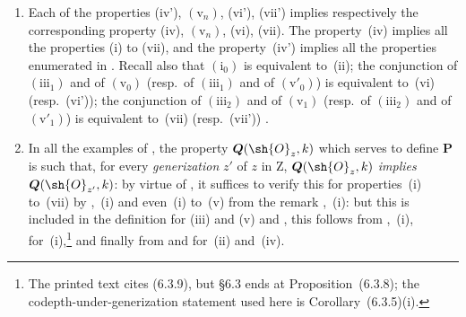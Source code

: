 \begin{remarks}[7.3.9]
\label{IV.7.3.9}
\begin{enumerate}[label=\emph{\roman*)}]
  \item Each of the properties (iv'), $(\mathrm{v}_n)$, (vi'), (vii') implies respectively the corresponding property (iv), $(\mathrm{v}_n)$, (vi), (vii).
  The property~(iv) implies all the properties (i) to (vii), and the property~(iv') implies all the properties enumerated in .
  Recall also that $(\mathrm{i}_0)$ is equivalent to~(ii); the conjunction of $(\mathrm{iii}_1)$ and of $(\mathrm{v}_0)$ (resp.~of $(\mathrm{iii}_1)$ and of $(\mathrm{v}'_0)$) is equivalent to~(vi) (resp.~(vi')); the conjunction of $(\mathrm{iii}_2)$ and of $(\mathrm{v}_1)$ (resp.~of $(\mathrm{iii}_2)$ and of $(\mathrm{v}'_1)$) is equivalent to~(vii) (resp.~(vii')) .

  \item In all the examples of , the property $\boldsymbol{Q}(\sh{O}_z,k)$ which serves to define $\boldsymbol{P}$ is such that, for every \emph{generization} $z'$ of $z$ in $\mathrm{Z}$, $\boldsymbol{Q}(\sh{O}_z,k)$ \emph{implies} $\boldsymbol{Q}(\sh{O}_{z'},k)$: by virtue of , it suffices to verify this for properties~(i) to~(vii) by ,~(i) and even~(i) to~(v) from the remark ,~(i): but this is included in the definition for (iii) and (v)  and , this follows from ,~(i), for~(i),\footnote{The printed text cites (6.3.9), but \S6.3 ends at Proposition~(6.3.8); the codepth-under-generization statement used here is Corollary~(6.3.5)(i).} and finally from  and  for~(ii) and~(iv).
\end{enumerate}
\end{remarks}

